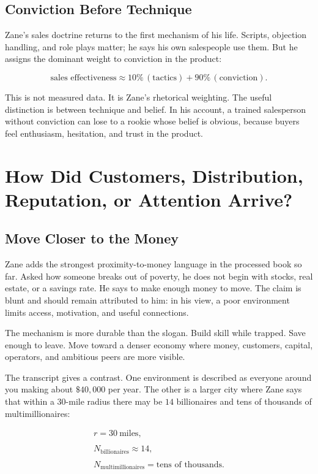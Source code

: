 \documentclass[11pt,oneside]{book}
\begin{document}
\section{Conviction Before Technique}

Zane's sales doctrine returns to the first mechanism of his life. Scripts, objection handling, and role plays matter; he says his own salespeople use them. But he assigns the dominant weight to conviction in the product:

\begin{equation}
\text{sales effectiveness}
\approx
10\%\,(\text{tactics})+90\%\,(\text{conviction}).
\end{equation}

This is not measured data. It is Zane's rhetorical weighting. The useful distinction is between technique and belief. In his account, a trained salesperson without conviction can lose to a rookie whose belief is obvious, because buyers feel enthusiasm, hesitation, and trust in the product.

\chapter{How Did Customers, Distribution, Reputation, or Attention Arrive?}

\section{Move Closer to the Money}

Zane adds the strongest proximity-to-money language in the processed book so far. Asked how someone breaks out of poverty, he does not begin with stocks, real estate, or a savings rate. He says to make enough money to move. The claim is blunt and should remain attributed to him: in his view, a poor environment limits access, motivation, and useful connections.

The mechanism is more durable than the slogan. Build skill while trapped. Save enough to leave. Move toward a denser economy where money, customers, capital, operators, and ambitious peers are more visible.

The transcript gives a contrast. One environment is described as everyone around you making about \(\$40{,}000\) per year. The other is a larger city where Zane says that within a \(30\)-mile radius there may be \(14\) billionaires and tens of thousands of multimillionaires:

\begin{equation}
\begin{gathered}
r=30\ \mathrm{miles},\\
\qquad\\
N_{\mathrm{billionaires}}\approx 14,\\
\qquad\\
N_{\mathrm{multimillionaires}}=\text{tens of thousands}.
\end{gathered}
\end{equation}
\end{document}

